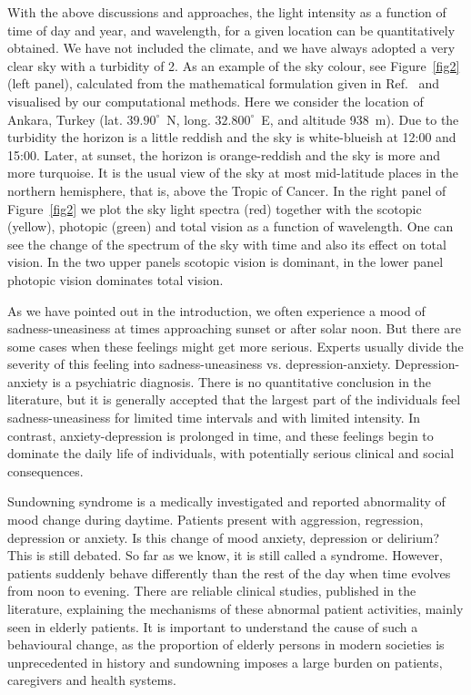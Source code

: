 \documentclass[brainsci,article,submit,moreauthors]{Definitions/mdpi}
\begin{document}
With the above discussions and approaches, the light intensity as a function of time of day and year, and wavelength, for a given location can be quantitatively obtained. We have not included the climate, and we have always adopted a very clear sky with a turbidity of 2. As an example of the sky colour, see Figure~\ref{fig2} (left panel), calculated from the mathematical formulation given in Ref.~\citep{preetham1999} and visualised by our computational methods. Here we consider the location of Ankara, Turkey (lat. $39.90^{\circ}$~N, long. $32.800^{\circ}$~E, and altitude 938~m). Due to the turbidity the horizon is a little reddish and the sky is white-blueish at 12:00 and 15:00. Later, at sunset, the horizon is orange-reddish and the sky is more and more turquoise. It is the usual view of the sky at most mid-latitude places in the northern hemisphere, that is, above the Tropic of Cancer. In the right panel of Figure~\ref{fig2} we plot the sky light spectra (red) together with the scotopic (yellow), photopic (green) and total vision as a function of wavelength. One can see the change of the spectrum of the sky with time and also its effect on total vision. In the two upper panels scotopic vision is dominant, in the lower panel photopic vision dominates total vision.

As we have pointed out in the introduction, we often experience a mood of sadness-uneasiness at times approaching sunset or after solar noon. But there are some cases when these feelings might get more serious. Experts usually divide the severity of this feeling into sadness-uneasiness vs. depression-anxiety. Depression-anxiety is a psychiatric diagnosis. There is no quantitative conclusion in the literature, but it is generally accepted that the largest part of the individuals feel sadness-uneasiness for limited time intervals and with limited intensity. In contrast, anxiety-depression is prolonged in time, and these feelings begin to dominate the daily life of individuals, with potentially serious clinical and social consequences.

Sundowning syndrome is a medically investigated and reported abnormality of mood change during daytime. Patients present with aggression, regression, depression or anxiety. Is this change of mood anxiety, depression or delirium? This is still debated. So far as we know, it is still called a syndrome. However, patients suddenly behave differently than the rest of the day when time evolves from noon to evening. There are reliable clinical studies, published in the literature, explaining the mechanisms of these abnormal patient activities, mainly seen in elderly patients. It is important to understand the cause of such a behavioural change, as the proportion of elderly persons in modern societies is unprecedented in history and sundowning imposes a large burden on patients, caregivers and health systems.
\end{document}
